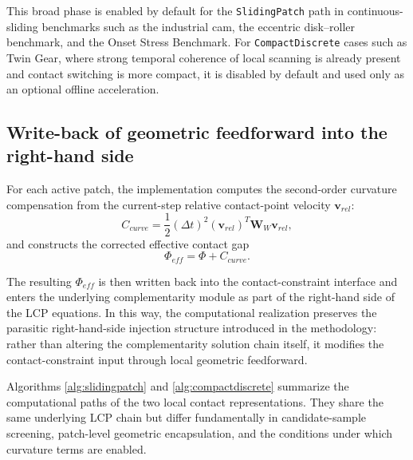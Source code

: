 This broad phase is enabled by default for the \texttt{SlidingPatch} path in continuous-sliding benchmarks such as the industrial cam, the eccentric disk--roller benchmark, and the Onset Stress Benchmark. For \texttt{CompactDiscrete} cases such as Twin Gear, where strong temporal coherence of local scanning is already present and contact switching is more compact, it is disabled by default and used only as an optional offline acceleration.

\subsection{Write-back of geometric feedforward into the right-hand side}
For each active patch, the implementation computes the second-order curvature compensation from the current-step relative contact-point velocity $\mathbf{v}_{rel}$:
\begin{equation}
    C_{curve} = \frac{1}{2} (\Delta t)^2 (\mathbf{v}_{rel})^T \mathbf{W}_{W} \mathbf{v}_{rel},
\end{equation}
and constructs the corrected effective contact gap
\begin{equation}
    \Phi_{eff} = \Phi + C_{curve}.
\end{equation}

The resulting $\Phi_{eff}$ is then written back into the contact-constraint interface and enters the underlying complementarity module as part of the right-hand side of the LCP equations. In this way, the computational realization preserves the parasitic right-hand-side injection structure introduced in the methodology: rather than altering the complementarity solution chain itself, it modifies the contact-constraint input through local geometric feedforward.

Algorithms \ref{alg:slidingpatch} and \ref{alg:compactdiscrete} summarize the computational paths of the two local contact representations. They share the same underlying LCP chain but differ fundamentally in candidate-sample screening, patch-level geometric encapsulation, and the conditions under which curvature terms are enabled.

